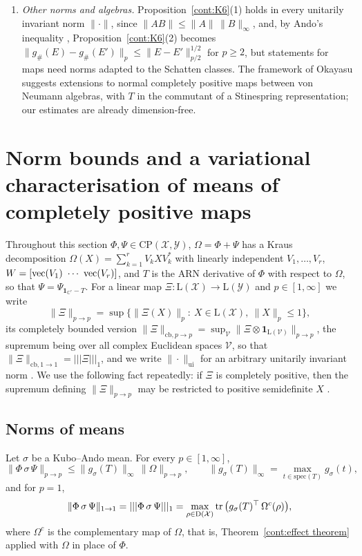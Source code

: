 \begin{enumerate}
\item \emph{Other norms and algebras.} Proposition~\ref{cont:K6}(1) holds in every unitarily invariant norm $\|\cdot\|$, since $\|AB\|\leq\|A\|\,\|B\|_\infty$, and, by Ando's inequality \cite{Ando1988}, Proposition~\ref{cont:K6}(2) becomes $\|g_\#(E)-g_\#(E')\|_p\leq\|E-E'\|_{p/2}^{1/2}$ for $p\geq2$, but statements for maps need norms adapted to the Schatten classes. The framework of Okayasu \cite{Okayasu2026,Okayasu2026maxf} suggests extensions to normal completely positive maps between von Neumann algebras, with $T$ in the commutant of a Stinespring representation; our estimates are already dimension-free.
\end{enumerate}

\section{Norm bounds and a variational characterisation of means of completely positive maps}\label{cont:app:norms}
 
Throughout this section $\Phi,\Psi\in\mathrm{CP}(\mathcal{X},\mathcal{Y})$, $\Omega=\Phi+\Psi$ has a Kraus decomposition $\Omega(X)=\sum_{k=1}^rV_kXV_k^*$ with linearly independent $V_1,\dots,V_r$, $W=[\vectorise(V_1)\ \cdots\ \vectorise(V_r)]$, and $T$ is the ARN derivative of $\Phi$ with respect to $\Omega$, so that $\Psi=\Psi_{\mathbf{1}_{\mathbb{C}^r}-T}$. For a linear map $\Xi:\mathrm{L}(\mathcal{X})\to\mathrm{L}(\mathcal{Y})$ and $p\in[1,\infty]$ we write
\[
\|\Xi\|_{p\to p}=\sup\big\{\|\Xi(X)\|_p:\ X\in\mathrm{L}(\mathcal{X}),\ \|X\|_p\leq1\big\},
\]
its completely bounded version $\|\Xi\|_{\mathrm{cb},p\to p}=\sup_{\mathcal{V}}\|\Xi\otimes\mathbf{1}_{\mathrm{L}(\mathcal{V})}\|_{p\to p}$, the supremum being over all complex Euclidean spaces $\mathcal{V}$, so that $\|\Xi\|_{\mathrm{cb},1\to1}=|||\Xi|||_1$, and we write $\|\cdot\|_{\mathrm{ui}}$ for an arbitrary unitarily invariant norm \cite[Chapter~IV]{bhatia1997matrix}. We use the following fact repeatedly: if $\Xi$ is completely positive, then the supremum defining $\|\Xi\|_{p\to p}$ may be restricted to positive semidefinite $X$ \cite{Watrous2005notes}.
 
\subsection{Norms of means}
 
\begin{proposition}\label{cont:app:mean norm}
Let $\sigma$ be a Kubo--Ando mean. For every $p\in[1,\infty]$,
\[
\|\Phi\,\sigma\,\Psi\|_{p\to p}\leq\|g_\sigma(T)\|_\infty\,\|\Omega\|_{p\to p},\qquad \|g_\sigma(T)\|_\infty=\max_{t\in\mathrm{spec}(T)}g_\sigma(t),
\]
and for $p=1$,
\[
\|\Phi\,\sigma\,\Psi\|_{1\to1}=|||\Phi\,\sigma\,\Psi|||_1=\max_{\rho\in\mathrm{D}(\mathcal{X})}\operatorname{tr}\big(g_\sigma(T)^\top\,\Omega^c(\rho)\big),
\]
where $\Omega^c$ is the complementary map of $\Omega$, that is, Theorem~\ref{cont:effect theorem} applied with $\Omega$ in place of $\Phi$.
\end{proposition}
 
